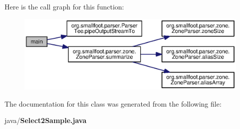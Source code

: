 Here is the call graph for this function\+:\nopagebreak
\begin{figure}[H]
\begin{center}
\leavevmode
\includegraphics[width=350pt]{classorg_1_1smallfoot_1_1parser_1_1boneheadbits_1_1Select2Sample_ae4faf7ff4190d227357ef851490d7757_cgraph}
\end{center}
\end{figure}




The documentation for this class was generated from the following file\+:\begin{DoxyCompactItemize}
\item 
java/{\bf Select2\+Sample.\+java}\end{DoxyCompactItemize}
